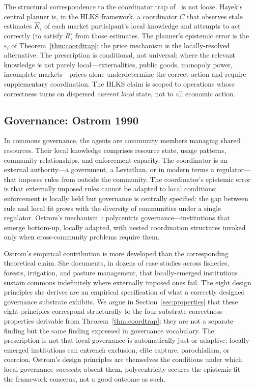 \documentclass[11pt]{article}
\theoremstyle{definition}
\theoremstyle{plain}
\theoremstyle{plain}
\begin{document}
The structural correspondence to the coordinator trap of~\cite{nicholson2026}
is not loose. Hayek's central planner is, in the HLKS framework, a coordinator
$C$ that observes stale estimates $\hat{K}_i$ of each market participant's
local knowledge and attempts to act correctly (to satisfy $R$) from those estimates. The planner's
epistemic error is the $\varepsilon_i$ of Theorem~\ref{thm:coordtrap}; the price
mechanism is the locally-resolved alternative. The prescription is conditional, not
universal: where the relevant knowledge is not purely local---externalities, public
goods, monopoly power, incomplete markets---prices alone underdetermine the correct
action and require supplementary coordination. The HLKS claim is scoped to operations
whose correctness turns on dispersed \emph{current local} state, not to all economic
action.

\subsection{Governance: Ostrom 1990}

In commons governance, the agents are community members managing shared
resources. Their local knowledge comprises resource state, usage patterns,
community relationships, and enforcement capacity. The coordinator is an
external authority---a government, a Leviathan, or in modern terms a
regulator---that imposes rules from outside the community. The coordinator's
epistemic error is that externally imposed rules cannot be adapted to local
conditions; enforcement is locally held but governance is centrally
specified; the gap between rule and local fit grows with the diversity of
communities under a single regulator. Ostrom's mechanism~\cite{ostrom1990}:
polycentric governance---institutions that emerge bottom-up, locally adapted,
with nested coordination structures invoked only when cross-community problems
require them.

Ostrom's empirical contribution is more developed than the corresponding
theoretical claim. She documents, in dozens of case studies across fisheries,
forests, irrigation, and pasture management, that locally-emerged institutions
sustain commons indefinitely where externally imposed ones fail. The eight
design principles she derives are an empirical specification of what a
correctly designed governance substrate exhibits. We argue in
Section~\ref{sec:properties} that these eight principles correspond
structurally to the four substrate correctness properties derivable from
Theorem~\ref{thm:coordtrap}: they are not a separate finding but the same
finding expressed in governance vocabulary. The prescription is not that local
governance is automatically just or adaptive: locally-emerged institutions can
entrench exclusion, elite capture, parochialism, or coercion. Ostrom's design
principles are themselves the conditions under which local governance \emph{succeeds};
absent them, polycentricity secures the epistemic fit the framework concerns, not a
good outcome as such.
\end{document}
